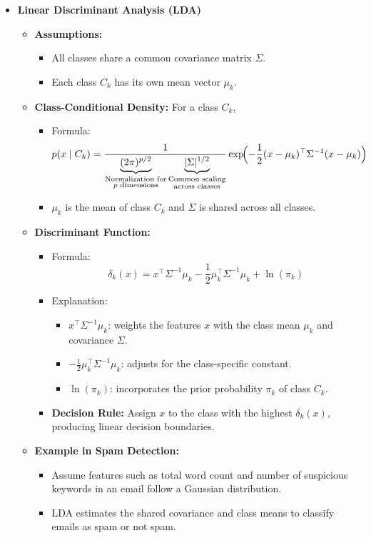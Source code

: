 \documentclass[10pt]{article}
\begin{document}
\begin{itemize}
    \item \textbf{Linear Discriminant Analysis (LDA)}
    \begin{itemize}
        \item \textbf{Assumptions:}
        \begin{itemize}
            \item All classes share a common covariance matrix \(\Sigma\).
            \item Each class \(C_k\) has its own mean vector \(\mu_k\).
        \end{itemize}
        \item \textbf{Class-Conditional Density:} For a class \(C_k\),
        \begin{itemize}
            \item Formula:
            \[
            p(x \mid C_k) = \frac{1}{\underbrace{(2\pi)^{p/2}}_{\substack{\text{Normalization for} \\ \text{\(p\) dimensions}}} \underbrace{|\Sigma|^{1/2}}_{\substack{\text{Common scaling} \\ \text{across classes}}}} \exp\!\Bigl(-\frac{1}{2}(x-\mu_k)^\top\Sigma^{-1}(x-\mu_k)\Bigr)
            \]
            \item \(\mu_k\) is the mean of class \(C_k\) and \(\Sigma\) is shared across all classes.
        \end{itemize}
        \item \textbf{Discriminant Function:}
        \begin{itemize}
            \item Formula:
            \[
            \delta_k(x) = x^\top\Sigma^{-1}\mu_k - \frac{1}{2}\mu_k^\top\Sigma^{-1}\mu_k + \ln(\pi_k)
            \]
            \item Explanation:
            \begin{itemize}
                \item \(x^\top\Sigma^{-1}\mu_k\): weights the features \(x\) with the class mean \(\mu_k\) and covariance \(\Sigma\).
                \item \(-\frac{1}{2}\mu_k^\top\Sigma^{-1}\mu_k\): adjusts for the class-specific constant.
                \item \(\ln(\pi_k)\): incorporates the prior probability \(\pi_k\) of class \(C_k\).
            \end{itemize}
            \item \textbf{Decision Rule:} Assign \(x\) to the class with the highest \(\delta_k(x)\), producing linear decision boundaries.
        \end{itemize}
        \item \textbf{Example in Spam Detection:}
        \begin{itemize}
            \item Assume features such as total word count and number of suspicious keywords in an email follow a Gaussian distribution.
            \item LDA estimates the shared covariance and class means to classify emails as spam or not spam.
        \end{itemize}
    \end{itemize}
    

\end{itemize}
\end{document}
